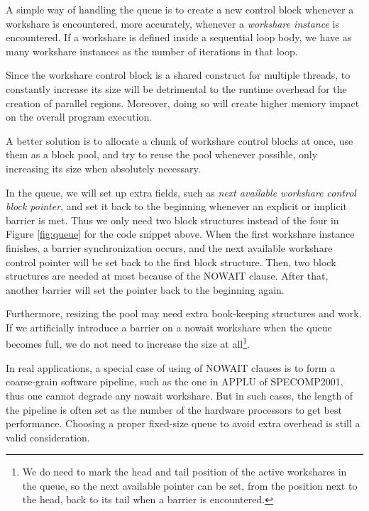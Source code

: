 A simple way of handling the queue is to create a new control block
whenever a workshare is encountered, more accurately, whenever a
\emph{workshare instance} is encountered. If a workshare is defined
inside a sequential loop body, we have as many workshare instances as
the number of iterations in that loop.

Since the workshare control block is a shared construct for multiple
threads, to constantly increase its size will be detrimental to the
runtime overhead for the creation of parallel regions. Moreover, doing so
will create higher memory impact on the overall program execution.

A better solution is to allocate a chunk of workshare control blocks
at once, use them as a block pool, and try to reuse the pool whenever 
possible, only increasing its size when absolutely necessary.

In the queue, we will set up extra fields, such as \emph{next
  available workshare control block pointer}, and set it back to the
beginning whenever an explicit or implicit barrier is met. Thus we
only need two block structures instead of the four in Figure
\ref{fig:queue} for the code snippet above. When the first workshare
instance finishes, a barrier synchronization occurs, and the next
available workshare control pointer will be set back to the first
block structure. Then, two block structures are needed at most because of
the NOWAIT clause. After that, another barrier will set the pointer
back to the beginning again.


Furthermore, resizing the pool may need extra book-keeping structures
and work. If we artificially introduce a barrier on a nowait workshare
when the queue becomes full, we do not need to increase the size at
all\footnote{We do need to mark the head and tail position of the
active workshares in the queue, so the next available pointer can be
set, from the position next to the head, back to its tail when a
barrier is encountered.}.

In real applications, a special case of using of NOWAIT clauses is to
form a coarse-grain software pipeline, such as the one in APPLU of
SPECOMP2001\cite{Spe01}, thus one cannot degrade any nowait
workshare. But in such cases, the length of the pipeline is often set
as the number of the hardware processors to get best performance.
Choosing a proper fixed-size queue to avoid extra overhead is still a
valid consideration.

